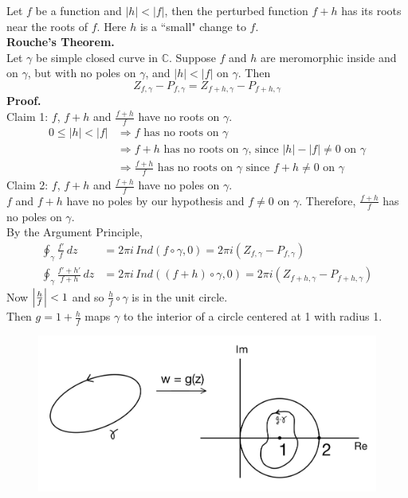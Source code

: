 \documentclass[11pt]{article}
\DeclarePairedDelimiter\abs{\lvert}{\rvert}
\begin{document}
Let $f$ be a function and $|h| < |f|$, then the perturbed function $f + h$ has its roots near the roots of $f$. Here $h$ is a ``small" change to $f$. \\
\newline
\textbf{Rouche's Theorem.} \\
Let $\gamma$ be simple closed curve in $\mathbb{C}$. Suppose $f$ and $h$ are meromorphic inside and on $\gamma$, but with no poles on $\gamma$, and $|h| < |f|$ on $\gamma$. Then 
$$ Z_{f, \gamma} - P_{f, \gamma} = Z_{f + h, \gamma} - P_{f + h, \gamma} $$
\textbf{Proof.} \\
Claim 1: $f$, $f + h$ and $\frac{f + h}{f}$ have no roots on $\gamma$. 
\begin{align*}
0 \leqslant |h| < |f| &\Rightarrow f \text{ has no roots on } \gamma \\
&\Rightarrow f + h \text{ has no roots on } \gamma \text{, since } |h| - |f| \neq 0 \text{ on } \gamma \\
&\Rightarrow \frac{f + h}{f} \text{ has no roots on } \gamma \text{ since } f + h \neq 0 \text{ on } \gamma
\end{align*}
Claim 2: $f$, $f + h$ and $\frac{f + h}{f}$ have no poles on $\gamma$. \\
$f$ and $f + h$ have no poles by our hypothesis and $f \neq 0$ on $\gamma$. Therefore, $\frac{f + h}{f}$ has no poles on $\gamma$. \\
By the Argument Principle, 
\begin{align*}
\oint_{\gamma} \frac{f'}{f} \, dz &= 2 \pi i\,Ind(f\circ \gamma, 0) = 2\pi i( Z_{f, \gamma} - P_{f, \gamma}) \\
\oint_{\gamma} \frac{f' + h'}{f + h} \, dz &= 2\pi i\, Ind\left((f + h) \circ \gamma, 0\right) = 2\pi i(Z_{f + h, \gamma} - P_{f + h, \gamma})
\end{align*}
Now $\abs*{\frac{h}{f}} < 1$ and so $\frac{h}{f} \circ \gamma$ is in the unit circle. \\
Then $g = 1 + \frac{h}{f}$ maps $\gamma$ to the interior of a circle centered at 1 with radius 1. \\
\begin{figure}[H]
\includegraphics[scale = 0.18]{22_11}
\centering
\end{figure}
\end{document}
